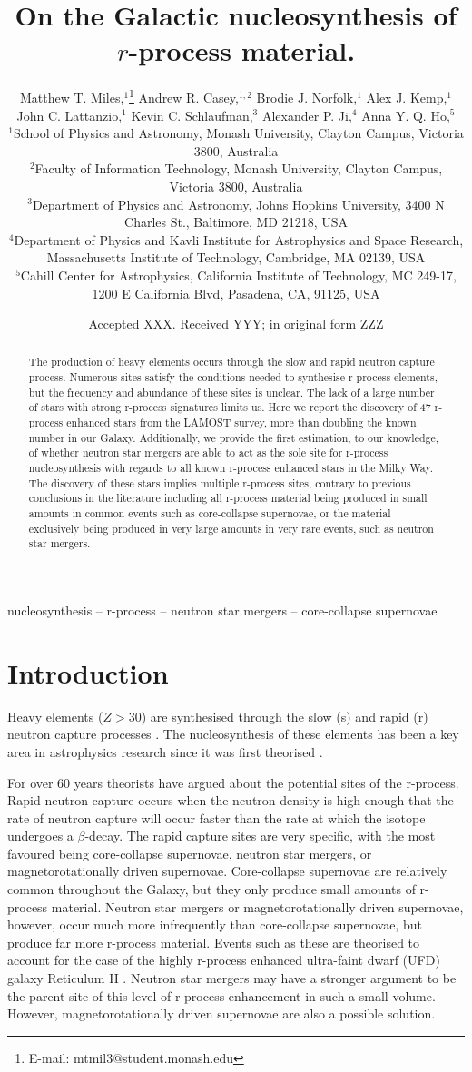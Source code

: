 \documentclass[a4paper,fleqn,usenatbib]{mnras}
\title[On the Galactic nucleosynthesis of $r$-process material.]{On the Galactic nucleosynthesis of $r$-process material.}
\author[Matthew T. Miles et al.]{Matthew T. Miles,$^{1}$\thanks{E-mail: mtmil3@student.monash.edu}
	Andrew R. Casey,$^{1,2}$
	Brodie J. Norfolk,$^{1}$
	Alex J. Kemp,$^{1}$\newauthor
	John C. Lattanzio,$^{1}$
	Kevin C. Schlaufman,$^{3}$
	Alexander P. Ji,$^{4}$
	Anna Y. Q. Ho,$^{5}$
	\\
	$^{1}$School of Physics and Astronomy, Monash University, Clayton Campus, Victoria 3800, Australia\\
	$^{2}$Faculty of Information Technology, Monash University, Clayton Campus, Victoria 3800, Australia\\
	$^{3}$Department of Physics and Astronomy, Johns Hopkins University, 3400 N Charles St., Baltimore, MD 21218, USA\\
	$^{4}$Department of Physics and Kavli Institute for Astrophysics and Space Research, Massachusetts Institute of Technology, Cambridge, MA 02139, USA\\
	$^{5}$Cahill Center for Astrophysics, California Institute of Technology, MC 249-17, 1200 E California Blvd, Pasadena, CA, 91125, USA
}
\date{Accepted XXX. Received YYY; in original form ZZZ}
\begin{document}
	\label{firstpage}
	\pagerange{\pageref{firstpage}--\pageref{lastpage}}
	\maketitle
	
	\begin{abstract}
		The production of heavy elements occurs through the slow and rapid neutron capture process. Numerous sites satisfy the conditions needed to synthesise r-process elements, but the frequency and abundance of these sites is unclear. The lack of a large number of stars with strong r-process signatures limits us. Here we report the discovery of 47 r-process enhanced stars from the LAMOST survey, more than doubling the known number in our Galaxy. Additionally, we provide the first estimation, to our knowledge, of whether neutron star mergers are able to act as the sole site for r-process nucleosynthesis with regards to all known r-process enhanced stars in the Milky Way. The discovery of these stars implies multiple r-process sites, contrary to previous conclusions in the literature including all r-process material being produced in small amounts in common events such as core-collapse supernovae, or the material exclusively being produced in very large amounts in very rare events, such as neutron star mergers. 
	\end{abstract}
	
	\begin{keywords}
		nucleosynthesis -- r-process -- neutron star mergers -- core-collapse supernovae
	\end{keywords}
	
	
	\section{Introduction}
	
	Heavy elements ($Z > 30$) are synthesised through the slow (s) and rapid (r) neutron capture processes \citep{Sneden2008}. The nucleosynthesis of these elements has been a key area in astrophysics research since it was first theorised  \citep{Burbidge1957}.
	
	For over 60 years theorists have argued about the potential sites of the r-process. Rapid neutron capture occurs when the neutron density is high enough that the rate of neutron capture will occur faster than the rate at which the isotope undergoes a $\beta$-decay. The rapid capture sites are very specific, with the most favoured being core-collapse supernovae, neutron star mergers, or magnetorotationally driven supernovae. Core-collapse supernovae are relatively common throughout the Galaxy, but they only produce small amounts of r-process material. Neutron star mergers or magnetorotationally driven supernovae, however, occur much more infrequently than core-collapse supernovae, but produce far more r-process material. Events such as these are theorised to account for the case of the highly r-process enhanced ultra-faint dwarf (UFD) galaxy Reticulum II \citep{Ji2016}. Neutron star mergers may have a stronger argument to be the parent site of this level of r-process enhancement in such a small volume. However, magnetorotationally driven supernovae are also a possible solution.
\end{document}
